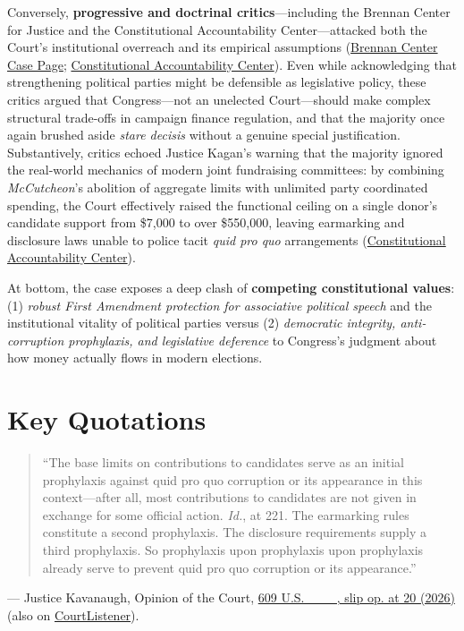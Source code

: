 \documentclass[12pt]{article}
\begin{document}
Conversely, \textbf{progressive and doctrinal critics}---including the Brennan Center for Justice and the Constitutional Accountability Center---attacked both the Court's institutional overreach and its empirical assumptions (\href{https://www.brennancenter.org/our-work/research-reports/national-republican-senatorial-committee-v-federal-election-commission}{Brennan Center Case Page}; \href{https://www.theusconstitution.org/litigation/national-republican-senatorial-committee-v-federal-election-commission/}{Constitutional Accountability Center}). Even while acknowledging that strengthening political parties might be defensible as legislative policy, these critics argued that Congress---not an unelected Court---should make complex structural trade-offs in campaign finance regulation, and that the majority once again brushed aside \textit{stare decisis} without a genuine special justification. Substantively, critics echoed Justice Kagan's warning that the majority ignored the real-world mechanics of modern joint fundraising committees: by combining \textit{McCutcheon}'s abolition of aggregate limits with unlimited party coordinated spending, the Court effectively raised the functional ceiling on a single donor's candidate support from \$7,000 to over \$550,000, leaving earmarking and disclosure laws unable to police tacit \textit{quid pro quo} arrangements (\href{https://www.theusconstitution.org/litigation/national-republican-senatorial-committee-v-federal-election-commission/}{Constitutional Accountability Center}).

At bottom, the case exposes a deep clash of \textbf{competing constitutional values}: (1) \textit{robust First Amendment protection for associative political speech} and the institutional vitality of political parties versus (2) \textit{democratic integrity, anti-corruption prophylaxis, and legislative deference} to Congress's judgment about how money actually flows in modern elections.

\section{Key Quotations}

\begin{quote}
``The base limits on contributions to candidates serve as an initial prophylaxis against quid pro quo corruption or its appearance in this context---after all, most contributions to candidates are not given in exchange for some official action. \textit{Id.}, at 221. The earmarking rules constitute a second prophylaxis. The disclosure requirements supply a third prophylaxis. So prophylaxis upon prophylaxis upon prophylaxis already serve to prevent quid pro quo corruption or its appearance.''
\end{quote}
\noindent --- Justice Kavanaugh, Opinion of the Court, \href{https://www.supremecourt.gov/opinions/25pdf/24-621_h315.pdf}{609 U.S. \_\_\_, slip op. at 20 (2026)} (also on \href{https://www.courtlistener.com/opinion/10882240/national-republican-senatorial-committee-v-federal-election-commn/}{CourtListener}).
\end{document}
